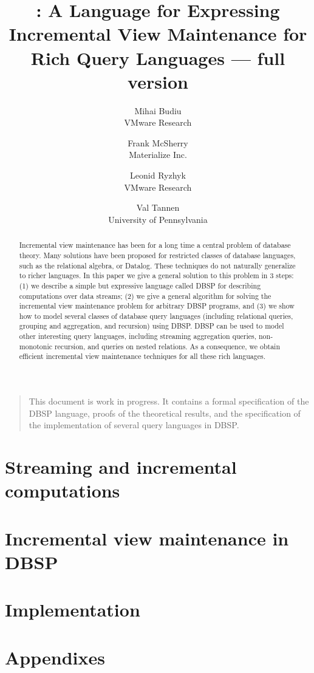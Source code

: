 \documentclass[10pt]{article}
\title{\dbsp: A Language for Expressing Incremental View Maintenance
  for Rich Query Languages --- full version}
\author{
Mihai Budiu \\ VMware Research \and
Frank McSherry \\ Materialize Inc. \and
Leonid Ryzhyk \\ VMware Research \and
Val Tannen \\ University of Pennsylvania
}
\theoremstyle{definition}
\newcommand{\dbsp}{DBSP\xspace}
\begin{document}
\maketitle

\begin{abstract}
Incremental view maintenance has been for a long time a central problem of database theory.
Many solutions have been proposed for restricted classes of database languages,
such as the relational algebra, or Datalog.  These techniques do not naturally generalize to
richer languages.  In this paper we give a general
solution to this problem in 3 steps: (1) we describe a simple but expressive language
called \dbsp for describing computations over data streams; (2) we give a general algorithm for
solving the incremental view maintenance problem for arbitrary \dbsp programs, and (3) we show
how to model several classes of database query languages (including relational queries,
grouping and aggregation, and recursion) using \dbsp.  \dbsp
can be used to model other interesting query languages, including
streaming aggregation queries, non-monotonic recursion, and queries on nested relations.
As a consequence, we obtain efficient
incremental view maintenance techniques for all these rich languages.
\end{abstract}

\begin{quote}
This document is work in progress.  It contains a formal specification
of the \dbsp language, proofs of the theoretical results, and the
specification of the implementation of several query languages in
\dbsp.
\end{quote}

\tableofcontents




\part{Streaming and incremental computations}


\part{Incremental view maintenance in \dbsp}





\part{Implementation}




\part{Appendixes}
\appendix


\printindex



\end{document}
